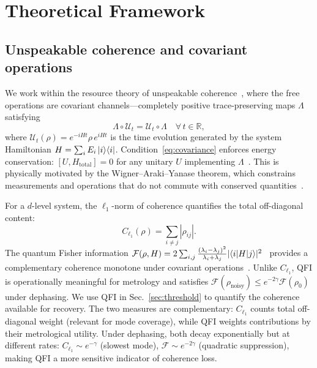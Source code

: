 \documentclass[prx,twocolumn,superscriptaddress,longbibliography,floatfix]{revtex4-2}
\begin{document}
\section{Theoretical Framework}
\label{sec:theory}

\subsection{Unspeakable coherence and covariant operations}
\label{sec:covariant}

We work within the resource theory of unspeakable coherence~\cite{Shiraishi2024,Marvian2013,Marvian2014,Lostaglio2019}, where the free operations are covariant channels---completely positive trace-preserving maps $\Lambda$ satisfying
\begin{equation}
\Lambda \circ \mathcal{U}_t = \mathcal{U}_t \circ \Lambda \quad \forall\, t \in \mathbb{R},
\label{eq:covariance}
\end{equation}
where $\mathcal{U}_t(\rho) = e^{-iHt} \rho\, e^{iHt}$ is the time evolution generated by the system Hamiltonian $H = \sum_i E_i \ket{i}\!\bra{i}$.
Condition~\eqref{eq:covariance} enforces energy conservation: $[U, H_\mathrm{total}] = 0$ for any unitary $U$ implementing $\Lambda$~\cite{Marvian2014}.
This is physically motivated by the Wigner--Araki--Yanase theorem, which constrains measurements and operations that do not commute with conserved quantities~\cite{Wigner1952}.

For a $d$-level system, the $\ell_1$-norm of coherence quantifies the total off-diagonal content:
\begin{equation}
C_{\ell_1}(\rho) = \sum_{i \neq j} |\rho_{ij}|.
\label{eq:l1coherence}
\end{equation}
The quantum Fisher information $\mathcal{F}(\rho, H) = 2 \sum_{i,j} \frac{(\lambda_i - \lambda_j)^2}{\lambda_i + \lambda_j} |\!\braket{i|H|j}\!|^2$~\cite{Braunstein1994} provides a complementary coherence monotone under covariant operations~\cite{Shiraishi2024}.
Unlike $C_{\ell_1}$, QFI is operationally meaningful for metrology and satisfies $\mathcal{F}(\rho_\mathrm{noisy}) \leq e^{-2\gamma} \mathcal{F}(\rho_0)$ under dephasing.
We use QFI in Sec.~\ref{sec:threshold} to quantify the coherence available for recovery.
The two measures are complementary: $C_{\ell_1}$ counts total off-diagonal weight (relevant for mode coverage), while QFI weights contributions by their metrological utility.
Under dephasing, both decay exponentially but at different rates: $C_{\ell_1} \sim e^{-\gamma}$ (slowest mode), $\mathcal{F} \sim e^{-2\gamma}$ (quadratic suppression), making QFI a more sensitive indicator of coherence loss.
\end{document}
